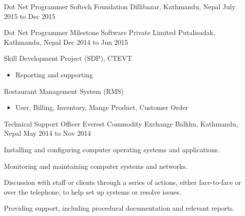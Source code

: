 

\begin{cventries}

  \cventry
    {Dot Net Programmer} %
    {Softech Foundation} %
    {Dillibazar, Kathmandu, Nepal} %
    {July 2015 to Dec 2015} %
    {}
 
  \cventry
    {Dot Net Programmer} %
    {Milestone Software Private Limited} %
    {Putalisadak, Kathmandu, Nepal} %
    {Dec 2014 to Jun 2015} %
    {
      \begin{cvitems} %
        \item {Skill Development Project (SDP), CTEVT}
        \begin{itemize}
        \item {Reporting and supporting}
        \end{itemize}
        \item {Restaurant Management System (RMS)}
        \begin{itemize}
        \item {User, Billing, Inventory, Mange Product, Customer Order}
        \end{itemize}
      \end{cvitems}
    }

  \cventry
    {Technical Support Officer} %
    {Everest Commodity Exchange} %
    {Balkhu, Kathmandu, Nepal} %
    {May 2014 to Nov 2014} %
    {
      \begin{cvitems} %
        \item {Installing and configuring computer operating systems and applications.}
        \item {Monitoring and maintaining computer systems and networks.}
        \item{Discussion with staff or clients through a series of actions, either face-to-face or over the telephone, to help set up systems or resolve issues.}
		\item{Providing support, including procedural documentation and relevant reports.}
      \end{cvitems} 
    }


\end{cventries}
